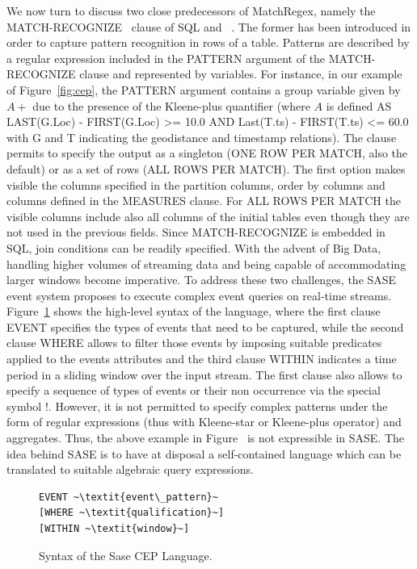 We now turn to discuss two close predecessors of MatchRegex, namely the MATCH-RECOGNIZE~\cite{zemke_et_al_2007} clause of SQL and 
~\cite{WuDR06}. The former has been introduced in order to capture pattern recognition in rows of a table. Patterns are described by a regular 
expression included in the PATTERN argument of the MATCH-RECOGNIZE clause and represented by variables. For instance, in our example of Figure~\ref{fig:cep}, the PATTERN argument contains a group variable given by $A+$ due to the presence of the Kleene-plus quantifier (where $A$ is defined AS
LAST(G.Loc) - FIRST(G.Loc) >= 10.0
        AND Last(T.ts) - FIRST(T.ts) <= 60.0 with G and T indicating the geodistance and timestamp relations). The clause permits to specify the output as a singleton (ONE ROW PER MATCH, also the default) or as a set of rows (ALL ROWS PER MATCH). The first option makes visible the columns specified in   the partition
columns, order by columns and columns defined in the MEASURES clause. For ALL
ROWS PER MATCH the visible columns include also all columns of the initial tables even though they are not used in the previous fields.
Since MATCH-RECOGNIZE is embedded in SQL, join conditions can be readily specified. 
With the advent of Big Data, handling higher volumes of streaming data and being capable of accommodating larger windows become imperative. To address these two challenges, the SASE event system proposes to execute complex event queries on real-time streams. 
Figure~\ref{fig:SASE} shows the high-level syntax of the language, where the first clause EVENT specifies the types of events that need to be captured, while the second clause WHERE allows to filter those events by imposing suitable predicates applied to the events attributes and the third clause WITHIN indicates a time period in a sliding window over the input stream.  The first clause also allows to specify a sequence of types of events or their non occurrence 
via the special symbol $!$. However, it is not permitted to specify complex patterns under the form of regular expressions (thus with Kleene-star or Kleene-plus operator) and aggregates. Thus, the above example in Figure~\label{fig:cep} is not expressible in SASE. The idea behind SASE is to have at disposal 
a self-contained language which can be translated to suitable algebraic query expressions. 

\begin{figure}[!h]
\begin{lstlisting}
EVENT ~\textit{event\_pattern}~
[WHERE ~\textit{qualification}~]
[WITHIN ~\textit{window}~]
\end{lstlisting}
\vspace*{-4mm}
\caption{\label{fig:SASE}Syntax of the Sase CEP Language.}
\end{figure}


